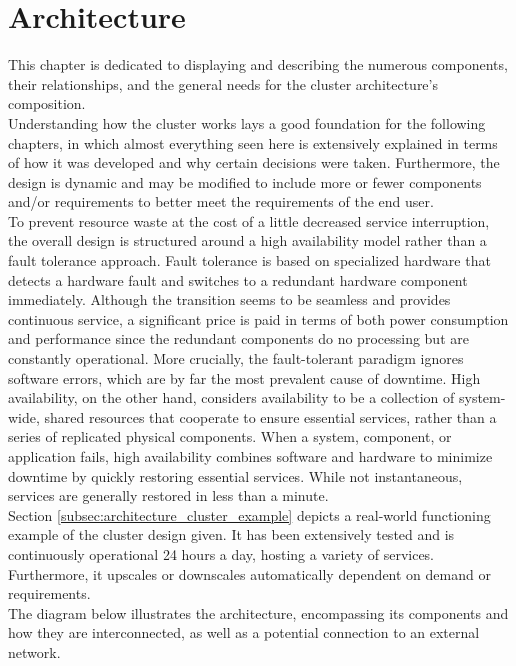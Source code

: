 \chapter{Architecture}
\label{cha:architecture}

This chapter is dedicated to displaying and describing the numerous components,
their relationships, and the general needs for the cluster architecture's composition.
\\ %
Understanding how the cluster works lays a good foundation for the following chapters,
in which almost everything seen here is extensively explained in terms of how it
was developed and why certain decisions were taken. Furthermore, the design is
dynamic and may be modified to include more or fewer components and/or
requirements to better meet the requirements of the end user. \\ %
To prevent resource waste at the cost of a little decreased service interruption,
the overall design is structured around a high availability model rather than a fault
tolerance approach. Fault tolerance is based on specialized hardware that
detects a hardware fault and switches to a redundant hardware component
immediately. Although the transition seems to be seamless and provides continuous
service, a significant price is paid in terms of both power consumption and
performance since the redundant components do no processing but are constantly
operational. More crucially, the fault-tolerant paradigm ignores software errors,
which are by far the most prevalent cause of downtime. High availability, on the
other hand, considers availability to be a collection of system-wide, shared resources
that cooperate to ensure essential services, rather than a series of replicated
physical components. When a system, component, or application fails, high
availability combines software and hardware to minimize downtime by quickly
restoring essential services. While not instantaneous, services are generally
restored in less than a minute\cite{high_availability_vs_fault_tolerance}. \\ %
Section \ref{subsec:architecture_cluster_example} depicts a real-world functioning
example of the cluster design given. It has been extensively tested and is
continuously operational 24 hours a day, hosting a variety of services.
Furthermore, it upscales or downscales automatically dependent on demand or requirements.
\\ %
The diagram below illustrates the architecture, encompassing its components and
how they are interconnected, as well as a potential connection to an external network.

